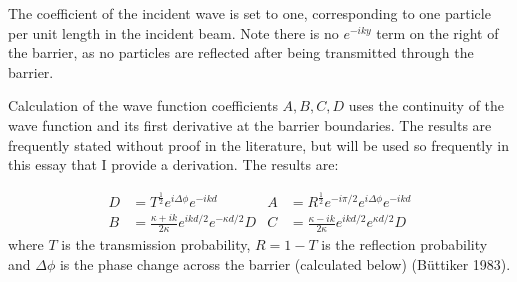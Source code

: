 \documentclass{article}
\begin{document}
The coefficient of the incident wave is set to one, corresponding to one particle per unit length in the incident beam. Note there is no $e^{-iky}$ term on the right of the barrier, as no particles are reflected after being transmitted through the barrier.

\noindent Calculation of the wave function coefficients $A,B,C,D$ uses the continuity of the wave function and its first derivative at the barrier boundaries. The results are frequently stated without proof in the literature, but will be used so frequently in this essay that I provide a derivation. The results are:

\begin{align}
	D &= T^{\frac{1}{2}}e^{i\Delta\phi}e^{-ikd} & A &= R^{\frac{1}{2}}e^{-i\pi/2}e^{i\Delta\phi}e^{-ikd} \nonumber \\
	B &= \frac{\kappa+ik}{2\kappa}e^{ikd/2}e^{-\kappa d/2}D & C &= \frac{\kappa-ik}{2\kappa}e^{ikd/2}e^{\kappa d/2}D \label{cont0}
\end{align}
where $T$ is the transmission probability, $R = 1-T$ is the reflection probability and $\Delta\phi$ is the phase change across the barrier (calculated below) (B{\"u}ttiker 1983).
\end{document}
